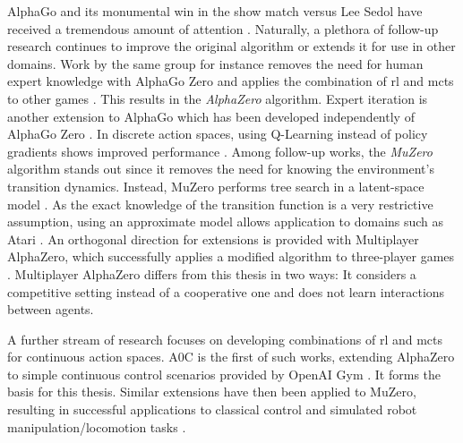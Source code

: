 AlphaGo and its monumental win in the show match versus Lee Sedol have received a tremendous amount of attention \cite{silverMasteringGameGo2016}. Naturally, a plethora of follow-up research continues to improve the original algorithm or extends it for use in other domains. Work by the same group for instance removes the need for human expert knowledge with AlphaGo Zero \cite{silverMasteringGameGo2017} and applies the combination of \gls{rl} and \gls{mcts} to other games \cite{silverGeneralReinforcementLearning2018}. This results in the \emph{AlphaZero} algorithm. Expert iteration is another extension to AlphaGo which has been developed independently of AlphaGo Zero \cite{anthonyThinkingFastSlow2017}. In discrete action spaces, using Q-Learning instead of policy gradients shows improved performance \cite{hamrickCOMBININGQLEARNINGSEARCH2020}. Among follow-up works, the \emph{MuZero} algorithm stands out since it removes the need for knowing the environment's transition dynamics. Instead, MuZero performs tree search in a latent-space model \cite{schrittwieserMasteringAtariGo2020}. As the exact knowledge of the transition function is a very restrictive assumption, using an approximate model allows application to domains such as Atari \cite{schrittwieserMasteringAtariGo2020}. An orthogonal direction for extensions is provided with Multiplayer AlphaZero, which successfully applies a modified algorithm to three-player games \cite{petosaMultiplayerAlphaZero2019}. Multiplayer AlphaZero differs from this thesis in two ways: It considers a competitive setting instead of a cooperative one and does not learn interactions between agents.

A further stream of research focuses on developing combinations of \gls{rl} and \gls{mcts} for continuous action spaces. A0C is the first of such works, extending AlphaZero to simple continuous control scenarios provided by OpenAI Gym \cite{brockmanOpenAIGym2016}. It forms the basis for this thesis. Similar extensions have then been applied to MuZero, resulting in successful applications to classical control and simulated robot manipulation/locomotion tasks \cite{yangContinuousControlSearching2020, hubertLearningPlanningComplex2021}.

